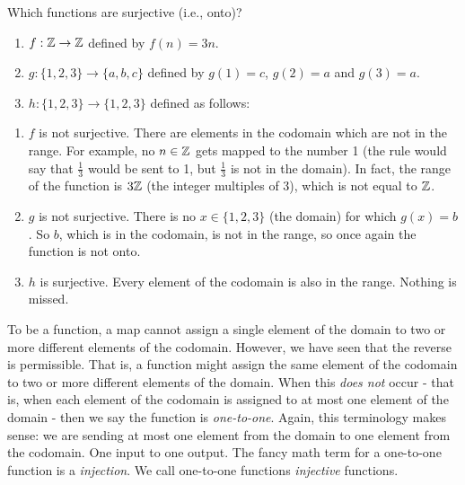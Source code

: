 \documentclass[12pt]{article}
\begin{document}
\begin{example}
  Which functions are surjective (i.e., onto)?
    \begin{enumerate}
    \item $f:\mathbb Z \to \mathbb Z$ defined by $f(n) = 3n$.  
    \item $g: \{1,2,3\} \to \{a,b,c\}$ defined by $g(1) = c$, $g(2) = a$ and $g(3) = a$.  
    \item $h:\{1,2,3\} \to \{1,2,3\}$ defined as follows:
    \begin{center}
    \end{center}
  \end{enumerate}
  \begin{solution}
    \begin{enumerate}
      \item $f$ is not surjective.  There are elements in the codomain which are not in the range.  For example, no $n \in \mathbb Z$ gets mapped to the number 1 (the rule would say that $\frac{1}{3}$ would be sent to 1, but $\frac{1}{3}$ is not in the domain).  In fact, the range of the function is $3\mathbb Z$ (the integer multiples of 3), which is not equal to $\mathbb Z$.
      \item $g$ is not surjective.  There is no $x \in \{1,2,3\}$ (the domain) for which $g(x) = b$.  So $b$, which is in the codomain, is not in the range, so once again the function is not onto.
      \item $h$ is surjective.  Every element of the codomain is also in the range.  Nothing is missed.
    \end{enumerate}

  \end{solution}

\end{example}


To be a function, a map cannot assign a single element of the domain to two or more different elements of the codomain.  However, we have seen that the reverse is permissible.  That is, a function might assign the same element of the codomain to two or more different elements of the domain.  When this \emph{does not} occur - that is, when each element of the codomain is assigned to at most one element of the domain - then we say the function is \emph{one-to-one}.  Again, this terminology makes sense: we are sending at most one element from the domain to one element from the codomain.  One input to one output. The fancy math term for a one-to-one function is a \emph{injection}.  We call one-to-one functions \emph{injective} functions.
\end{document}
